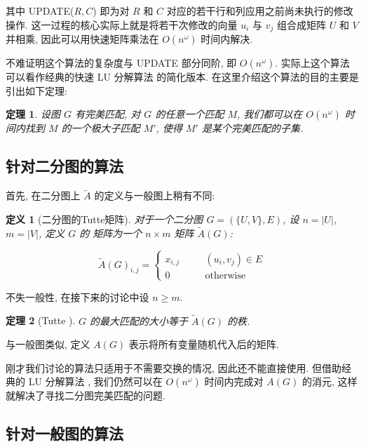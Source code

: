 \documentclass[a4paper]{article}
\newtheorem*{definition}{\hspace{2em}定义}
\newtheorem{theorem}{\hspace{2em}定理}
\begin{document}
			其中 UPDATE($R, C$) 即为对 $R$ 和 $C$ 对应的若干行和列应用之前尚未执行的修改操作. 这一过程的核心实际上就是将若干次修改的向量 $u_i$ 与 $v_j$ 组合成矩阵 $U$ 和 $V$ 并相乘, 因此可以用快速矩阵乘法在 $O(n^\omega)$ 时间内解决.

			不难证明这个算法的复杂度与 UPDATE 部分同阶, 即 $O(n^\omega)$. 实际上这个算法可以看作经典的快速 LU 分解算法 \cite{lu} 的简化版本. 在这里介绍这个算法的目的主要是引出如下定理:

			\begin{theorem}
				设图 $G$ 有完美匹配, 对 $G$ 的任意一个匹配 $M$, 我们都可以在 $O(n^\omega)$ 时间内找到 $M$ 的一个极大子匹配 $M'$, 使得 $M'$ 是某个完美匹配的子集.
				\label{submatch}
			\end{theorem}
		
		\subsection{针对二分图的算法}
			
			\hspace{2em}首先, 在二分图上 $\tilde A$ 的定义与一般图上稍有不同:

			\begin{definition}[二分图的Tutte矩阵]
				对于一个二分图 $G=(\{U, V\},E)$, 设 $n = |U|$, $m = |V|$, 定义 $G$ 的  矩阵为一个 $n \times m$ 矩阵 $\tilde A(G)$:

				$$ \tilde A(G)_{i,j} = \left\{ \begin{aligned} x_{i,j} & \quad & (u_i, v_j)\in E \\ 0 & \quad & \text{otherwise}\end{aligned} \right. $$
			\end{definition}

			不失一般性, 在接下来的讨论中设 $n \ge m$.

			\begin{theorem}[Tutte \cite{tuttetheorem}]
				$G$ 的最大匹配的大小等于 $\tilde A(G)$ 的秩.
			\end{theorem}
			
			与一般图类似, 定义 $A(G)$ 表示将所有变量随机代入后的矩阵.

			刚才我们讨论的算法只适用于不需要交换的情况, 因此还不能直接使用. 但借助经典的 LU 分解算法 \cite{lu} , 我们仍然可以在 $O(n^\omega)$ 时间内完成对 $A(G)$ 的消元, 这样就解决了寻找二分图完美匹配的问题.
		
		\subsection{针对一般图的算法}
\end{document}
